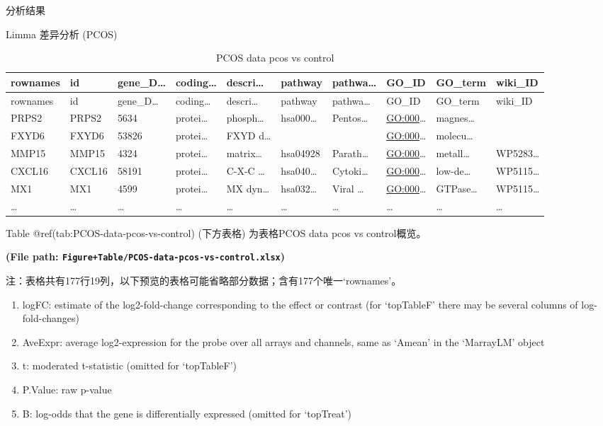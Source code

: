 \documentclass[
  ignorenonframetext,
]{beamer}
\providecommand{\tightlist}{%
  \setlength{\itemsep}{0pt}\setlength{\parskip}{0pt}}
\begin{document}
\begin{frame}[fragile]{分析结果}
\begin{block}{Limma 差异分析 (PCOS)}
\begin{longtable}[]{@{}llllllllll@{}}
\caption{PCOS data pcos vs control}\tabularnewline
\toprule
rownames & id & gene\_D\ldots{} & coding\ldots{} & descri\ldots{} &
pathway & pathwa\ldots{} & GO\_ID & GO\_term & wiki\_ID\tabularnewline
\midrule
\endfirsthead
\toprule
rownames & id & gene\_D\ldots{} & coding\ldots{} & descri\ldots{} &
pathway & pathwa\ldots{} & GO\_ID & GO\_term & wiki\_ID\tabularnewline
\midrule
\endhead
PRPS2 & PRPS2 & 5634 & protei\ldots{} & phosph\ldots{} & hsa000\ldots{}
& Pentos\ldots{} & \url{GO:000}\ldots{} & magnes\ldots{}
&\tabularnewline
FXYD6 & FXYD6 & 53826 & protei\ldots{} & FXYD d\ldots{} & & &
\url{GO:000}\ldots{} & molecu\ldots{} &\tabularnewline
MMP15 & MMP15 & 4324 & protei\ldots{} & matrix\ldots{} & hsa04928 &
Parath\ldots{} & \url{GO:000}\ldots{} & metall\ldots{} &
WP5283\ldots{}\tabularnewline
CXCL16 & CXCL16 & 58191 & protei\ldots{} & C-X-C \ldots{} &
hsa040\ldots{} & Cytoki\ldots{} & \url{GO:000}\ldots{} & low-de\ldots{}
& WP5115\ldots{}\tabularnewline
MX1 & MX1 & 4599 & protei\ldots{} & MX dyn\ldots{} & hsa032\ldots{} &
Viral \ldots{} & \url{GO:000}\ldots{} & GTPase\ldots{} &
WP5115\ldots{}\tabularnewline
\ldots{} & \ldots{} & \ldots{} & \ldots{} & \ldots{} & \ldots{} &
\ldots{} & \ldots{} & \ldots{} & \ldots{}\tabularnewline
\bottomrule
\end{longtable}

Table @ref(tab:PCOS-data-pcos-vs-control) (下方表格) 为表格PCOS data
pcos vs control概览。

\textbf{(File path:
\texttt{Figure+Table/PCOS-data-pcos-vs-control.xlsx})}

\begin{center}\begin{tcolorbox}[colback=gray!10, colframe=gray!50, width=0.9\linewidth, arc=1mm, boxrule=0.5pt]注：表格共有177行19列，以下预览的表格可能省略部分数据；含有177个唯一`rownames'。
\end{tcolorbox}
\end{center}
\begin{center}\begin{tcolorbox}[colback=gray!10, colframe=gray!50, width=0.9\linewidth, arc=1mm, boxrule=0.5pt]\begin{enumerate}\tightlist
\item logFC:  estimate of the log2-fold-change corresponding to the effect or contrast (for ‘topTableF’ there may be several columns of log-fold-changes)
\item AveExpr:  average log2-expression for the probe over all arrays and channels, same as ‘Amean’ in the ‘MarrayLM’ object
\item t:  moderated t-statistic (omitted for ‘topTableF’)
\item P.Value:  raw p-value
\item B:  log-odds that the gene is differentially expressed (omitted for ‘topTreat’)
\end{enumerate}\end{tcolorbox}
\end{center}


\end{block}
\end{frame}
\end{document}
